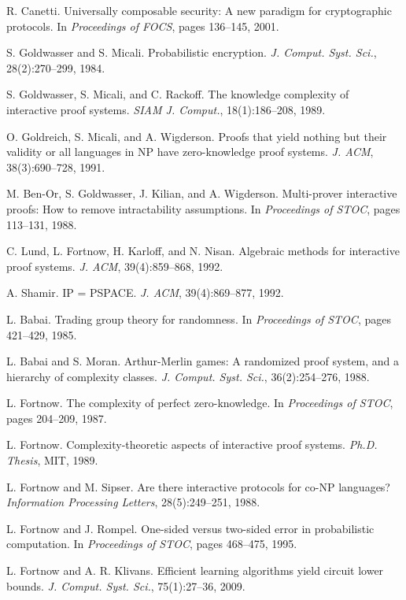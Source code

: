 \documentclass[11pt]{article}
\theoremstyle{definition}
\begin{document}
\begin{thebibliography}{99}
 R. Canetti. Universally composable security: A new paradigm for cryptographic protocols. In \emph{Proceedings of FOCS}, pages 136--145, 2001.

 S. Goldwasser and S. Micali. Probabilistic encryption. \emph{J. Comput. Syst. Sci.}, 28(2):270--299, 1984.

 S. Goldwasser, S. Micali, and C. Rackoff. The knowledge complexity of interactive proof systems. \emph{SIAM J. Comput.}, 18(1):186--208, 1989.

 O. Goldreich, S. Micali, and A. Wigderson. Proofs that yield nothing but their validity or all languages in NP have zero-knowledge proof systems. \emph{J. ACM}, 38(3):690--728, 1991.

 M. Ben-Or, S. Goldwasser, J. Kilian, and A. Wigderson. Multi-prover interactive proofs: How to remove intractability assumptions. In \emph{Proceedings of STOC}, pages 113--131, 1988.

 C. Lund, L. Fortnow, H. Karloff, and N. Nisan. Algebraic methods for interactive proof systems. \emph{J. ACM}, 39(4):859--868, 1992.

 A. Shamir. IP = PSPACE. \emph{J. ACM}, 39(4):869--877, 1992.

 L. Babai. Trading group theory for randomness. In \emph{Proceedings of STOC}, pages 421--429, 1985.

 L. Babai and S. Moran. Arthur-Merlin games: A randomized proof system, and a hierarchy of complexity classes. \emph{J. Comput. Syst. Sci.}, 36(2):254--276, 1988.

 L. Fortnow. The complexity of perfect zero-knowledge. In \emph{Proceedings of STOC}, pages 204--209, 1987.

 L. Fortnow. Complexity-theoretic aspects of interactive proof systems. \emph{Ph.D. Thesis}, MIT, 1989.

 L. Fortnow and M. Sipser. Are there interactive protocols for co-NP languages? \emph{Information Processing Letters}, 28(5):249--251, 1988.

 L. Fortnow and J. Rompel. One-sided versus two-sided error in probabilistic computation. In \emph{Proceedings of STOC}, pages 468--475, 1995.

 L. Fortnow and A. R. Klivans. Efficient learning algorithms yield circuit lower bounds. \emph{J. Comput. Syst. Sci.}, 75(1):27--36, 2009.


\end{thebibliography}
\end{document}
